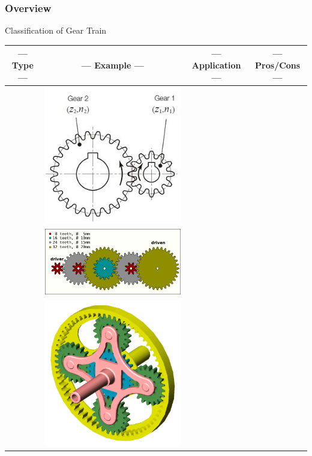 \documentclass[fleqn]{beamer} %
\newcommand{\sectiontitleI}{Overview} %
\begin{document}
	\begin{frame} \small
		\frametitle{\sectiontitleI}

		Classification of Gear Train

		\begin{tabular}{|c|c|c|c|} 
			--- Type --- & --- Example --- & --- Application --- & --- Pros/Cons --- \\ \hline
			& \includegraphics[scale=.20]{images/simple_gear_train.png} & & \\ \hline 
			& \includegraphics[scale=.20]{images/compound_gears.png} & & \\ \hline
			& \includegraphics[scale=.15]{images/planetary_gears.png} & & \\ \hline
		\end{tabular}

	\end{frame}
\end{document}
